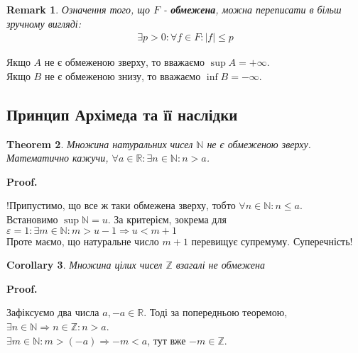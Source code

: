 \documentclass[a4paper, 14pt]{article}
\makeatletter
\def\huge{\displaystyle}
\def\qed{$\blacksquare$}
\theoremstyle{theoremdd}
\newtheorem{theorem}{Theorem}[subsection]
\theoremstyle{theoremdd}
\theoremstyle{theoremdd}
\theoremstyle{theoremdd}
\theoremstyle{theoremdd}
\theoremstyle{theoremdd}
\newtheorem{remark}[theorem]{Remark}
\theoremstyle{theoremdd}
\theoremstyle{theoremdd}
\newtheorem{corollary}[theorem]{Corollary}
\renewenvironment{proof}[1][Proof.\\]{\par
\pushQED{\hfill \qed}%
\normalfont \topsep6\p@\@plus6\p@\relax
\trivlist
\item\relax
{\bfseries
#1\@addpunct{.}}\hspace\labelsep\ignorespaces
}{%
\popQED\endtrivlist\@endpefalse
}
\makeatother
\begin{document}
	\begin{remark}
	Означення того, що $F$ - \textbf{обмежена}, можна переписати в більш зручному вигляді:
	\begin{align*}
	\exists p>0: \forall f \in F: |f| \leq p
	\end{align*}
	\end{remark}
	Якщо $A$ не є обмеженою зверху, то вважаємо $\sup A = +\infty$.\\
	Якщо $B$ не є обмеженою знизу, то вважаємо $\inf B = -\infty$.\\
	
	\subsection{Принцип Архімеда та її наслідки}
	\begin{theorem}
	Множина натуральних чисел $\mathbb{N}$ не є обмеженою зверху.\\
	Математично кажучи, $\forall a \in \mathbb{R}: \exists n \in \mathbb{N}: n > a$.
	\end{theorem}
	
	\begin{proof}
	!Припустимо, що все ж таки обмежена зверху, тобто $\forall n \in \mathbb{N}: n \leq a$.\\
	Встановимо $\huge\sup \mathbb{N} = u$. За критерієм, зокрема для $\varepsilon = 1: \exists m \in \mathbb{N}: m > u-1 \Rightarrow u < m+1$\\
	Проте маємо, що натуральне число $m+1$ перевищує супремуму. Суперечність!
	\end{proof}
	
	\begin{corollary}
	Множина цілих чисел $\mathbb{Z}$ взагалі не обмежена
	\end{corollary}
	
	\begin{proof}
	Зафіксуємо два числа $a,-a \in \mathbb{R}$. Тоді за попередньою теоремою,\\
	$\exists n \in \mathbb{N} \Rightarrow n \in \mathbb{Z}: n > a$.\\
	$\exists m \in \mathbb{N}: m > (-a) \Rightarrow -m < a$, тут вже $-m \in \mathbb{Z}$.
	\end{proof}
	
\end{document}
